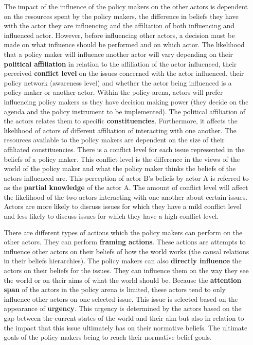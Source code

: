 The impact of the influence of the policy makers on the other actors is dependent on the resources spent by the policy makers, the difference in beliefs they have with the actor they are influencing and the affiliation of both influencing and influenced actor. However, before influencing other actors, a decision must be made on what influence should be performed and on which actor. The likelihood that a policy maker will influence another actor will vary depending on their {\bfseries political affiliation} in relation to the affiliation of the actor influenced, their perceived {\bfseries conflict level} on the issues concerned with the actor influenced, their policy network (awareness level) and whether the actor being influenced is a policy maker or another actor. Within the policy arena, actors will prefer influencing policy makers as they have decision making power (they decide on the agenda and the policy instrument to be implemented). The political affiliation of the actors relates them to specific {\bfseries constituencies}. Furthermore, it affects the likelihood of actors of different affiliation of interacting with one another. The resources available to the policy makers are dependent on the size of their affiliated constituencies. There is a conflict level for each issue represented in the beliefs of a policy maker. This conflict level is the difference in the views of the world of the policy maker and what the policy maker thinks the beliefs of the actors influenced are. This perception of actor B’s beliefs by actor A is referred to as the {\bfseries partial knowledge} of the actor A. The amount of conflict level will affect the likelihood of the two actors interacting with one another about certain issues. Actors are more likely to discuss issues for which they have a mild conflict level and less likely to discuss issues for which they have a high conflict level.

There are different types of actions which the policy makers can perform on the other actors. They can perform {\bfseries framing actions}. These actions are attempts to influence other actors on their beliefs of how the world works (the causal relations in their beliefs hierarchies). The policy makers can also {\bfseries directly influence} the actors on their beliefs for the issues. They can influence them on the way they see the world or on their aims of what the world should be. Because the {\bfseries attention span} of the actors in the policy arena is limited, these actors tend to only influence other actors on one selected issue. This issue is selected based on the appearance of {\bfseries urgency}. This urgency is determined by the actors based on the gap between the current states of the world and their aim but also in relation to the impact that this issue ultimately has on their normative beliefs. The ultimate goals of the policy makers being to reach their normative belief goals. 

